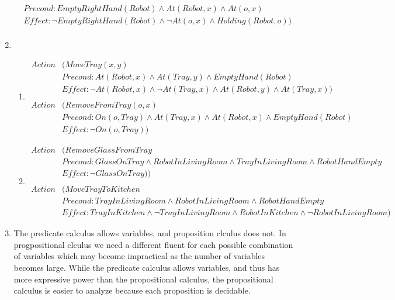 \documentclass[11pt]{article}
\begin{document}
\begin{enumerate}[label=\bfseries Question \arabic*:]
\begin{align*}
           & Precond: EmptyRightHand(Robot) \land At(Robot, x) \land At(o, x)\\
           & Effect: \lnot EmptyRightHand(Robot) \land \lnot At(o, x) \land Holding(Robot, o)) \\
  \end{align*}
\item
  \begin{enumerate}
  \item
    \begin{align*}
      Action &(MoveTray(x, y) \\
             & Precond: At(Robot, x) \land At(Tray,y) \land EmptyHand(Robot) \\
             & Effect: \lnot At(Robot, x) \land \lnot At(Tray, x) \land At(Robot, y) \land At(Tray, x)) \\
      \\
      Action & (RemoveFromTray(o, x)\\ 
             & Precond: On(o, Tray) \land At(Tray, x) \land At(Robot, x) \land EmptyHand(Robot)\\
             & Effect: \lnot On(o, Tray))
    \end{align*}
  \item
    \begin{align*}
      Action & (RemoveGlassFromTray \\
             & Precond: GlassOnTray \land RobotInLivingRoom \land TrayInLivingRoom \land RobotHandEmpty \\
             & Effect: \lnot GlassOnTray)) \\
      \\ 
      Action & ( MoveTrayToKitchen\\
             & Precond: TrayInLivingRoom \land RobotInLivingRoom \land RobotHandEmpty\\
             & Effect: TrayInKitchen \land \lnot TrayInLivingRoom \land RobotInKitchen \land \lnot RobotInLivingRoom)
    \end{align*}
  \end{enumerate}
\item The predicate calculus allows variables, and proposition clculus
  does not.  In progpositional clculus we need a different fluent for
  each possible combination of variables which may become impractical
  as the number of variables becomes large.  While the predicate
  calculus allows variables, and thus has more expressive power than
  the propositional calculus, the propositional calculus is easier to
  analyze because each proposition is decidable.

\end{enumerate}
\end{document}
